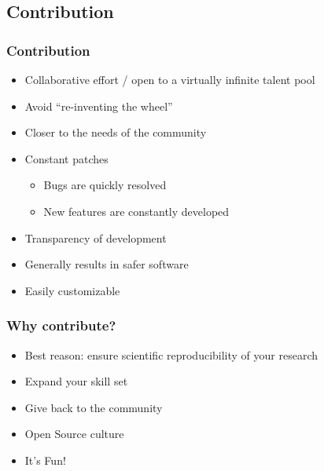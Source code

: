 \documentclass{beamer}
\begin{document}







\subsection{Contribution}

\begin{frame}
\frametitle{Contribution}
\begin{itemize}
    \item Collaborative effort / open to a virtually infinite talent pool
    \item Avoid “re-inventing the wheel”
    \item Closer to the needs of the community
    \item Constant patches 
    \begin{itemize}
    \item Bugs are quickly resolved 
    \item New features are constantly developed
    
    \end{itemize}
    \item Transparency of development
    \item Generally results in safer software
    \item Easily customizable
\end{itemize}
\end{frame}

\begin{frame}
\frametitle{Why contribute?}
\begin{itemize}
    \item Best reason: ensure scientific reproducibility of your research
    \item Expand your skill set
    \item Give back to the community
    \item Open Source culture
    \item It’s Fun!
\end{itemize}
\end{frame}
\end{document}
